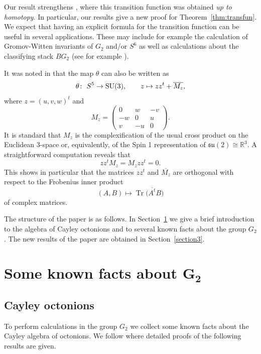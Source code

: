 \documentclass[pdftex]{sigma}
\numberwithin{equation}{section}
\begin{document}
Our result strengthens \cite[Corollary~3]{chaves96complex}, where this transition function was obtained \emph{up to homotopy}. In particular, our results give a new proof for Theorem~\ref{thm:transfun}. We expect that having an explicit formula for the transition function can be useful in several applications. These may include for example the calculation of Gromov-Witten invariants of $G_2$ and/or $S^6$ as well as calculations about the classifying stack $BG_2$ (see for example \cite[Section~3.2]{pirisi2017motivic}).

It was noted in \cite[Section~2]{puttmann2003presentations} that the map $\theta$ can also be written as
\begin{gather*}
\theta\colon \ S^5 \rightarrow {\rm SU}(3), \qquad z\mapsto zz^t+\overline{M_z},
\end{gather*}
where $z=(u,v,w)^t$ and
\[M_z=
\begin{pmatrix}
0 & w &-v\\
-w & 0 & u \\
v & -u & 0
\end{pmatrix}.
\]
It is standard that $M_z$ is the complexification of the usual cross product on the Euclidean 3-space or, equivalently, of the Spin 1 representation of $\mathfrak{su}(2) \cong \mathbb{R}^3$. A straightforward computation reveals that
\[ zz^tM_z=M_zzz^t=0.\]
This shows in particular that the matrices $zz^t$ and $\overline{M_z}$ are orthogonal with respect to the Frobenius inner product
\[ (A,B) \mapsto \operatorname{Tr}\big(\overline{A^t}B\big) \]
of complex matrices.

The structure of the paper is as follows. In Section~\ref{section2} we give a brief introduction to the algebra of Cayley octonions and to several known facts about the group $G_2$. The new results of the paper are obtained in Section~\ref{section3}.

\section[Some known facts about $G_2$]{Some known facts about $\boldsymbol{G_2}$}\label{section2}

\subsection{Cayley octonions}\label{section2.1}

To perform calculations in the group $G_2$ we collect some known facts about the Cayley algebra of octonions. We follow \cite{postnikov1986lie} where detailed proofs of the following results are given.
\end{document}
